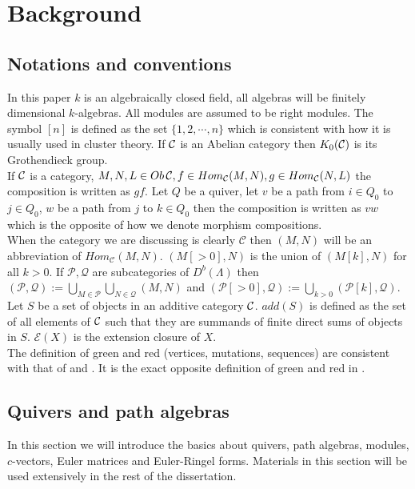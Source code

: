 \chapter{Background}\label{CB}
\section{Notations and conventions}
\indent In this paper $k$ is an algebraically closed field, all algebras will be finitely dimensional $k$-algebras. All modules are assumed to be right modules. The symbol $[n]$ is defined as the set $\{1,2,\cdots, n\}$ which is consistent with how it is usually used in cluster theory. If $\mathcal{C}$ is an Abelian category then $K_0(\mathcal{C})$ is its Grothendieck group.\\
\indent If $\mathcal{C}$ is a category, $M, N, L\in Ob\,\mathcal{C}, f\in Hom_{\mathcal{C}}(M, N), g\in Hom_{\mathcal{C}}(N, L)$ the composition is written as $gf$. Let $Q$ be a quiver, let $v$ be a path from $i\in Q_0$ to $j\in Q_0$, $w$ be a path from $j$ to $k\in Q_0$ then the composition is written as $vw$ which is the opposite of how we denote morphism compositions.\\
\indent When the category we are discussing is clearly $\mathcal{C}$ then $(M,N)$ will be an abbreviation of $Hom_{\mathcal{C}}(M,N)$. $(M[>0],N)$ is the union of $(M[k],N)$ for all $k>0$. If $\mathcal{P}, \mathcal{Q}$ are subcategories of $D^b(\Lambda)$ then $(\mathcal{P}, \mathcal{Q}):=\bigcup\limits_{M\in\mathcal{P}}\bigcup\limits_{N\in\mathcal{Q}}(M,N)$ and $(\mathcal{P}[>0], \mathcal{Q}):=\bigcup\limits_{k>0}(\mathcal{P}[k], \mathcal{Q})$. Let $S$ be a set of objects in an additive category $\mathcal{C}$. $add(S)$ is defined as the set of all elements of $\mathcal{C}$ such that they are summands of finite direct sums of objects in $S$. $\mathcal{E}(X)$ is the extension closure of $X$.\\
\indent The definition of green and red (vertices, mutations, sequences) are consistent with that of \cite{Kel11} and \cite{BDP13}. It is the exact opposite definition of green and red in \cite{BHIT15}.\\
\section{Quivers and path algebras}
\indent In this section we will introduce the basics about quivers, path algebras, modules, $c$-vectors, Euler matrices and Euler-Ringel forms. Materials in this section will be used extensively in the rest of the dissertation.
